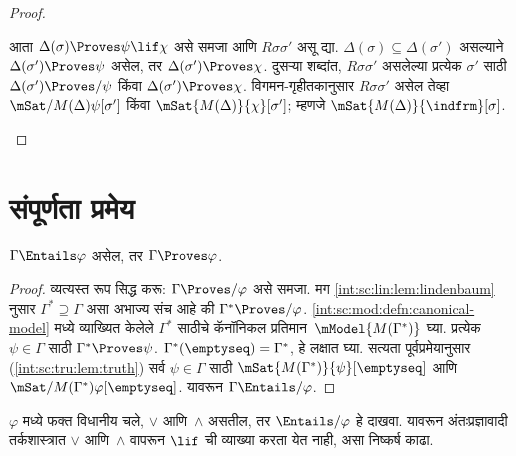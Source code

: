 \begin{proof}
\begin{enumerate}
{        आता $\Delta(\sigma) \Proves \psi \lif \chi$
        असे समजा आणि $R\sigma\sigma'$ असू द्या.
        $\Delta(\sigma) \subseteq
        \Delta(\sigma')$ असल्याने
        $\Delta(\sigma') \Proves
        \psi$ असेल, तर
        $\Delta(\sigma') \Proves \chi$.
        दुसऱ्या शब्दांत, $R\sigma\sigma'$
        असलेल्या प्रत्येक $\sigma'$ साठी
        $\Delta(\sigma') \Proves/ \psi$
        किंवा $\Delta(\sigma') \Proves
        \chi$. विगमन-गृहीतकानुसार
        $R\sigma\sigma'$ असेल तेव्हा
        $\mSat/{M(\Delta)}{\psi}[\sigma']$
        किंवा $\mSat{M(\Delta)}{\chi}[\sigma']$;
        म्हणजे
        $\mSat{M(\Delta)}{\indfrm}[\sigma]$.}
  \end{enumerate}
\end{proof}












\section{संपूर्णता प्रमेय}\label{int:sc:cpl:sec}

\begin{thm}\label{int:sc:cpl:thm:completeness}
  $\Gamma \Entails \varphi$ असेल, तर
  $\Gamma \Proves \varphi$.
\end{thm}

\begin{proof}
  व्यत्यस्त रूप सिद्ध करू:
  $\Gamma \Proves/ \varphi$ असे समजा.
  मग \ref{int:sc:lin:lem:lindenbaum} नुसार
  $\Gamma^* \supseteq \Gamma$ असा
  अभाज्य संच आहे की
  $\Gamma^* \Proves/ \varphi$.
  \ref{int:sc:mod:defn:canonical-model}
  मध्ये व्याख्यित केलेले $\Gamma^*$ साठीचे
  कॅनॉनिकल प्रतिमान~$\mModel{M(\Gamma^*)}$
  घ्या. प्रत्येक $\psi \in \Gamma$
  साठी $\Gamma^* \Proves \psi$.
  $\Gamma^*(\emptyseq) = \Gamma^*$,
  हे लक्षात घ्या. सत्यता पूर्वप्रमेयानुसार
  (\ref{int:sc:tru:lem:truth})
  सर्व $\psi \in \Gamma$ साठी
  $\mSat{M(\Gamma^*)}{\psi}[\emptyseq]$
  आणि
  $\mSat/{M(\Gamma^*)}{\varphi}[\emptyseq]$.
  यावरून $\Gamma \Entails/ \varphi$.
\end{proof}

\begin{prob}
  $\varphi$ मध्ये फक्त विधानीय चले,
  $\lor$ आणि~$\land$ असतील, तर
  $\Entails/ \varphi$ हे दाखवा.
  यावरून अंतःप्रज्ञावादी तर्कशास्त्रात
  $\lor$ आणि~$\land$ वापरून
  $\lif$ ची व्याख्या करता येत नाही,
  असा निष्कर्ष काढा.
\end{prob}

